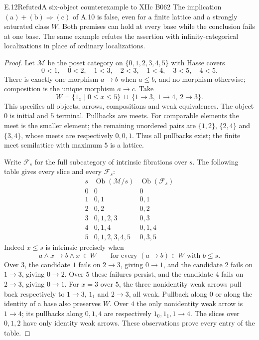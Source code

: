 \begin{claim}{E.12}{Refuted}{A six-object counterexample to XIIc B062}
The implication $\mathrm{(a)}+\mathrm{(b)}\Rightarrow\mathrm{(c)}$ of A.10 is false, even for a finite lattice and a strongly saturated class $W$. Both premises can hold at every base while the conclusion fails at one base. The same example refutes the assertion with infinity-categorical localizations in place of ordinary localizations.
\end{claim}
\begin{proof}
Let $\mathcal M$ be the poset category on $\{0,1,2,3,4,5\}$ with Hasse covers
\[
 0<1,\quad 0<2,\quad 1<3,\quad 2<3,\quad
 1<4,\quad 3<5,\quad 4<5.
\]
There is exactly one morphism $a\to b$ when $a\leq b$, and no morphism otherwise; composition is the unique morphism $a\to c$. Take
\[
 W=\{1_x\mid 0\leq x\leq5\}\ \cup\
 \{1\to3,\ 1\to4,\ 2\to3\}.
\]
This specifies all objects, arrows, compositions and weak equivalences. The object $0$ is initial and $5$ terminal. Pullbacks are meets. For comparable elements the meet is the smaller element; the remaining unordered pairs are $\{1,2\}$, $\{2,4\}$ and $\{3,4\}$, whose meets are respectively $0,0,1$. Thus all pullbacks exist; the finite meet semilattice with maximum $5$ is a lattice.

Write $\mathcal F_s$ for the full subcategory of intrinsic fibrations over $s$. The following table gives every slice and every $\mathcal F_s$:
\[
\begin{array}{c|l|l}
s&\operatorname{Ob}(\mathcal M/s)&\operatorname{Ob}(\mathcal F_s)\\ \hline
0&0&0\\
1&0,1&0,1\\
2&0,2&0,2\\
3&0,1,2,3&0,3\\
4&0,1,4&0,1,4\\
5&0,1,2,3,4,5&0,3,5
\end{array}
\]
Indeed $x\leq s$ is intrinsic precisely when
\[
 a\wedge x\longrightarrow b\wedge x\ \in W
 \qquad\text{for every }(a\to b)\in W\text{ with }b\leq s.
\]
Over $3$, the candidate $1$ fails on $2\to3$, giving $0\to1$, and the candidate $2$ fails on $1\to3$, giving $0\to2$. Over $5$ these failures persist, and the candidate $4$ fails on $2\to3$, giving $0\to1$. For $x=3$ over $5$, the three nonidentity weak arrows pull back respectively to $1\to3$, $1_1$ and $2\to3$, all weak. Pullback along $0$ or along the identity of a base also preserves $W$. Over $4$ the only nonidentity weak arrow is $1\to4$; its pullbacks along $0,1,4$ are respectively $1_0,1_1,1\to4$. The slices over $0,1,2$ have only identity weak arrows. These observations prove every entry of the table.


\end{proof}
